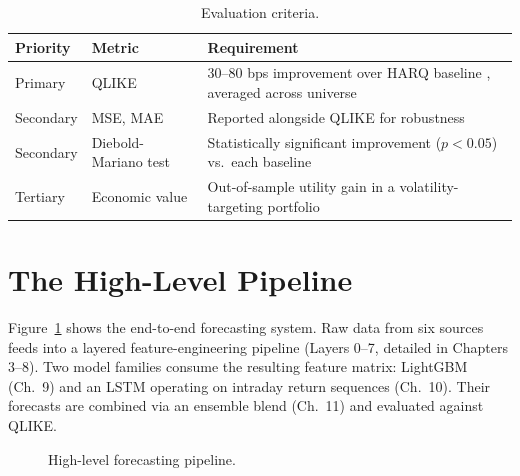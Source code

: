 \begin{table}[ht]
\centering
\caption{Evaluation criteria.}
\label{tab:criteria}
\begin{tabular}{@{}llp{7.5cm}@{}}
\toprule
Priority & Metric & Requirement \\
\midrule
Primary   & QLIKE & 30--80 bps improvement over HARQ baseline \citep{BPQ2016}, averaged across universe \\
Secondary & MSE, MAE & Reported alongside QLIKE for robustness \\
Secondary & Diebold-Mariano test & Statistically significant improvement ($p < 0.05$) vs.\ each baseline \citep{DieboldMariano1995} \\
Tertiary  & Economic value & Out-of-sample utility gain in a volatility-targeting portfolio \citep{MoreiraMuir2017} \\
\bottomrule
\end{tabular}
\end{table}

\section{The High-Level Pipeline}

Figure~\ref{fig:pipeline} shows the end-to-end forecasting system.
Raw data from six sources feeds into a layered feature-engineering pipeline (Layers 0--7, detailed in Chapters 3--8).
Two model families consume the resulting feature matrix: LightGBM (Ch.~9) and an LSTM operating on intraday return sequences (Ch.~10).
Their forecasts are combined via an ensemble blend (Ch.~11) and evaluated against QLIKE.

\begin{figure}[ht]
\centering
{}
\caption{High-level forecasting pipeline.}
\label{fig:pipeline}
\end{figure}

